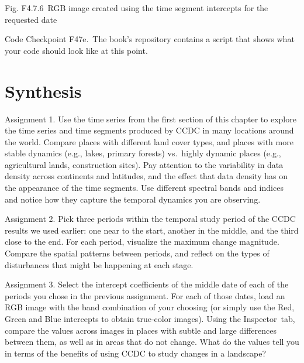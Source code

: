 \documentclass[
  letterpaper,
  DIV=11,
  numbers=noendperiod]{scrreprt}
\begin{document}
Fig. F4.7.6~RGB image created using the time segment intercepts for the
requested date

\begin{tcolorbox}[enhanced jigsaw, left=2mm, breakable, rightrule=.15mm, opacityback=0, colframe=quarto-callout-note-color-frame, colbacktitle=quarto-callout-note-color!10!white, arc=.35mm, opacitybacktitle=0.6, toptitle=1mm, colback=white, leftrule=.75mm, title=\textcolor{quarto-callout-note-color}{\faInfo}\hspace{0.5em}{Note}, toprule=.15mm, bottomtitle=1mm, titlerule=0mm, bottomrule=.15mm, coltitle=black]

Code Checkpoint F47e.~The book's repository contains a script that shows
what your code should look like at this point.

\end{tcolorbox}

\hypertarget{synthesis-10}{%
\section*{Synthesis}\label{synthesis-10}}


Assignment 1. Use the time series from the first section of this chapter
to explore the time series and time segments produced by CCDC in many
locations around the world. Compare places with different land cover
types, and places with more stable dynamics (e.g., lakes, primary
forests) vs.~highly dynamic places (e.g., agricultural lands,
construction sites). Pay attention to the variability in data density
across continents and latitudes, and the effect that data density has on
the appearance of the time segments. Use different spectral bands and
indices and notice how they capture the temporal dynamics you are
observing.

Assignment 2. Pick three periods within the temporal study period of the
CCDC results we used earlier: one near to the start, another in the
middle, and the third close to the end. For each period, visualize the
maximum change magnitude. Compare the spatial patterns between periods,
and reflect on the types of disturbances that might be happening at each
stage.

Assignment 3. Select the intercept coefficients of the middle date of
each of the periods you chose in the previous assignment. For each of
those dates, load an RGB image with the band combination of your
choosing (or simply use the Red, Green and Blue intercepts to obtain
true-color images). Using the Inspector~tab, compare the values across
images in places with subtle and large differences between them, as well
as in areas that do not change. What do the values tell you in terms of
the benefits of using CCDC to study changes in a landscape?
\end{document}
